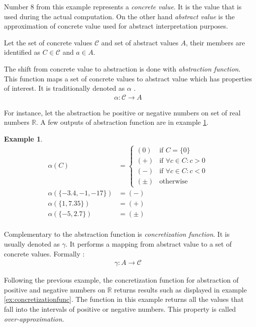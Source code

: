 \documentclass[12pt,final,oneside]{fithesis2}
\theoremstyle{definition}
\newtheorem{example}{Example}[chapter]
\begin{document}
Number 8 from this example represents a \textit{concrete value}. It is
the value that is used during the actual computation. On the other hand
\textit{abstract value} is the approximation of concrete value used for
abstract interpretation purposes.

Let the set of concrete values $\mathcal{C}$ and set of abstract values $A$,
their members are identified as $C \in \mathcal{C}$ and $a \in A$.

The shift from concrete value to abstraction is done with
\textit{abstraction function}. This function maps a set of concrete values
to abstract value which has properties of interest. It is traditionally
denoted as $\alpha$ \cite{CousotCousot76-1}.
\begin{align*}
\alpha : \mathcal{C} \to A
\end{align*}

For instance, let the abstraction be positive or negative numbers on set of
real numbers $\mathbb{R}$. A few outputs of abstraction function are in
example \ref{ex:abstractionfunc}.

\begin{example}
\label{ex:abstractionfunc}
\begin{align*}
\alpha(C) &=
\begin{cases}
(0) & \text{if } C = \{ 0 \} \\
(+) & \text{if } \forall c \in C : c > 0 \\
(-) & \text{if } \forall c \in C : c < 0 \\
(\pm) & \text{otherwise}
\end{cases} \\
\alpha(\{ -3.4, -1, -17 \}) &= (-) \\
\alpha(\{ 1, 7.35 \}) &= (+) \\
\alpha(\{ -5, 2.7 \}) &= (\pm) \\
\end{align*}
\end{example}

Complementary to the abstraction function is \textit{concretization
function}. It is usually denoted as $\gamma$. It performs a mapping from
abstract value to a set of concrete values. Formally
\cite{CousotCousot76-1}:
\begin{align*}
\gamma : A \to \mathcal{C}
\end{align*}

Following the previous example, the concretization function for abstraction
of positive and negative numbers on $\mathbb{R}$ returns results such as
displayed in example \ref{ex:concretizationfunc}. The function in this
example returns all the values that fall into the intervals of positive
or negative numbers. This property is called \textit{over-approximation}.
\end{document}

